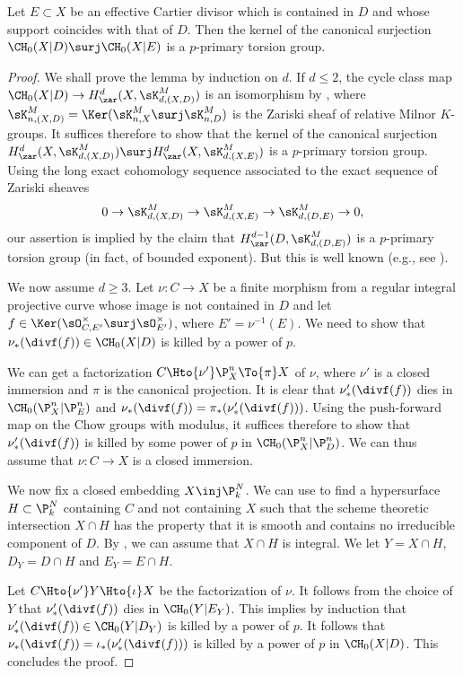 \begin{lem}\label{lem:Kernel-mod}
Let $E \subset X$ be an effective Cartier divisor which is contained in $D$ and
whose support coincides with that of $D$. Then the kernel of the canonical surjection
$\CH_0(X|D) \surj \CH_0(X|E)$ is a $p$-primary torsion group.
\end{lem}
\begin{proof}
We shall prove the lemma by induction on $d$.
If $d \le 2$, the cycle class map $\CH_0(X|D) \to H^{d}_\zar(X, \sK^M_{d, (X,D)})$
is an isomorphism by \cite[Th.\,1.8]{BK}, where $\sK^M_{n, (X,D)} =
\Ker(\sK^M_{n, X} \surj \sK^M_{n,D})$ is the Zariski sheaf of relative Milnor $K$\nobreakdash-groups.
It suffices therefore to show that the kernel of the canonical surjection
$H^{d}_\zar(X, \sK^M_{d, (X,D)}) \surj H^{d}_\zar(X, \sK^M_{d, (X,E)})$ is
a $p$-primary torsion group.
Using the long exact cohomology sequence associated to the exact sequence of
Zariski sheaves
\[
0 \to \sK^M_{d, (X,D)} \to \sK^M_{d, (X,E)} \to \sK^M_{d, (D,E)} \to 0,
\]
our assertion is implied by the claim that $H^{d-1}_\zar(D, \sK^M_{d, (D, E)})$ is a
$p$-primary torsion group (in fact, of bounded exponent).
But this is well known (e.g., see \cite[Lem.\,2.6]{GKris}).

We now assume $d \ge 3$.
Let $\nu \colon C \to X$ be a finite morphism from a regular integral
projective curve whose image is not contained in $D$
and let $f \in \Ker(\sO^{\times}_{C,E'} \surj \sO^{\times}_{E'})$,
where $E' = \nu^{-1}(E)$. We need to show that $\nu_*(\divf(f)) \in
\CH_0(X|D)$ is killed by a power of $p$.

We can get a factorization $C \Hto{\nu'}
\P^n_X \To{\pi} X$ of $\nu$, where $\nu'$ is a closed
immersion and $\pi$ is the canonical projection. It is
clear that $\nu'_*(\divf(f))$ dies in $\CH_0(\P^n_X|\P^n_E)$ and
$\nu_*(\divf(f)) = \pi_*(\nu'_*(\divf(f)))$.
Using the push-forward map on the Chow groups with modulus,
it suffices therefore to show that
$\nu'_*(\divf(f))$ is killed by some power of $p$ in $\CH_0(\P^n_X|\P^n_D)$.
We can thus assume that $\nu \colon C \to X$ is a closed immersion.

We now fix a closed embedding $X \inj \P^N_k$. We can use \cite[Th.\,7]{AK}
to find a hypersurface $H \subset \P^N_k$ containing $C$ and not containing $X$
such that the scheme theoretic intersection $X \cap H$
has the property that it is smooth and contains
no irreducible component of $D$. By \cite[Cor.\,3.13]{GK}, we can assume
that $X \cap H$ is integral. We let $Y = X \cap H$, $D_Y = D \cap H$
and $E_Y = E \cap H$.

Let $C \Hto{\nu'} Y \Hto{\iota} X$
be the factorization of $\nu$.
It follows from the choice of $Y$ that
$\nu'_*(\divf(f))$ dies in $\CH_0(Y| E_Y)$. This implies by induction that
$\nu'_*(\divf(f)) \in \CH_0(Y|D_Y)$ is killed by a power of $p$.
It follows that $\nu_*(\divf(f)) = \iota _* (\nu'_*(\divf(f)))$
is killed by a power of $p$ in $\CH_0(X|D)$. This concludes the proof.
\end{proof}

